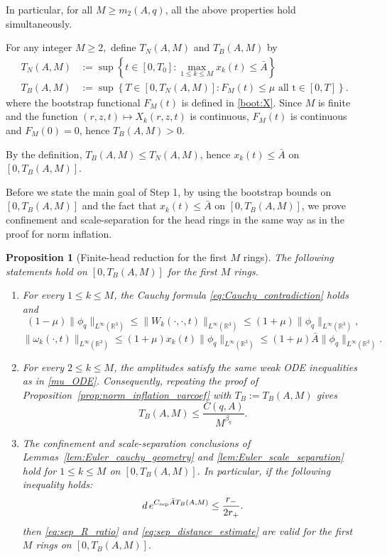 \documentclass[reqno,11pt]{amsart}
\newtheorem{proposition}[theorem]{Proposition}
\begin{document}
In particular, for all $M \ge m_2(A,q)$, all the above properties hold simultaneously.





\medskip
{}



For any integer $M\geq 2,$ define
$T_N(A,M)$ and $T_B(A,M)$ by 
    \begin{align*}
        T_N(A,M)
        &:= \sup \left\{t\in [0,T_0]: \max_{1\leq k \leq M} x_k(t) \leq \bar A\right\}
        \\
        T_B(A,M)
        &:= \sup \left\{T\in [0,T_N(A,M)]: F_M(t) \leq \mu  \text{ all t} \in [0,T] \right\}.
    \end{align*}
where the bootstrap functional
$F_M(t)$ is defined in  \eqref{boot:X}.
Since $M$ is finite and the function $(r,z,t)\mapsto X_k(r,z,t)$ is continuous, $F_M(t)$ is continuous and $F_M(0)=0$, hence $T_B(A,M)>0$. 

By the definition, $T_B(A,M)\leq T_N(A,M)$, hence $x_k(t) \leq \bar A$ on $[0,T_B(A,M)]$.

Before we state the main goal of Step 1, 
by using the bootstrap bounds on $[0,T_B(A,M)]$ and the fact that $x_k(t) \leq \bar A $ on $[0,T_B(A,M)]$, we prove confinement and scale-separation for the head rings in the same way as in the proof for norm inflation.
\begin{proposition}[Finite-head reduction for the first $M$ rings]
\label{prop:finite_head_reduction}
 The following statements hold on
$[0,T_B(A,M)]$ for the first $M$ rings.

\begin{enumerate}
\item[(i)] For every $1\le k\le M$, the Cauchy formula \eqref{eq:Cauchy_contradiction} holds and
\[
(1-\mu)\|\phi_q\|_{L^\infty(\mathbb{R}^3)}
\le
\|W_k(\cdot,\cdot,t)\|_{L^\infty(\mathbb{R}^3)}
\le
(1+\mu)\|\phi_q\|_{L^\infty(\mathbb{R}^3)},
\]
\[
\|\omega_k(\cdot,t)\|_{L^\infty(\mathbb{R}^3)}
\le
(1+\mu)x_k(t)\|\phi_q\|_{L^\infty(\mathbb{R}^3)}
\le
(1+\mu)\bar A\|\phi_q\|_{L^\infty(\mathbb{R}^3)}.
\]

\item[(ii)] For every $2\le k\le M$, the amplitudes satisfy the same weak ODE inequalities as in
\eqref{mu_ODE}. Consequently, repeating the proof of
Proposition~\ref{prop:norm_inflation_varcoef} with $T_B:=T_B(A,M)$ gives
\[
T_B(A,M)\le \frac{C(q,A)}{M^{\beta_q}}.
\]

\item[(iii)] The confinement and scale-separation conclusions of
Lemmas~\ref{lem:Euler_cauchy_geometry} and \ref{lem:Euler_scale_separation} hold for
$1\le k\le M$ on $[0,T_B(A,M)]$. In particular, if the following inequality holds:
\begin{equation}
\label{eq:def_m0_blow_up}
d\,e^{C_{\rm sep}\bar A T_B(A,M)}\le \frac{r_-}{2r_+}.
\end{equation}
 then
\eqref{eq:sep_R_ratio} and \eqref{eq:sep_distance_estimate} are valid for the first $M$
rings on $[0,T_B(A,M)]$.
\end{enumerate}
\end{proposition}
\end{document}
